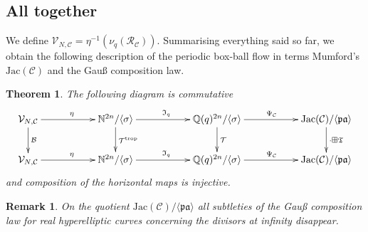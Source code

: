 \documentclass[11pt, a4paper]{amsart}
\newcommand{\jac}{\mathrm{Jac(\mathcal C)}}
\newcommand{\eqst}[1]{\begin{equation*}#1\end{equation*}}
\theoremstyle{plain}
\newtheorem{theorem}{Theorem}[section]
\newtheorem{remark}{Remark}[section]
\numberwithin{equation}{section}
\begin{document}
\subsection{All together}
We define $\mathcal V_{N,\mathcal C} = \eta^{-1}(\nu_q(\mathcal R _\mathcal C))$.
Summarising everything said so far, we obtain the following description of the periodic box-ball flow in terms Mumford's $\jac$ and the Gauß composition law. 
\begin{theorem}
\label{maintheorem2}
The following diagram is commutative
\eqst{\xymatrix{\mathcal V_{N,\mathcal C}\ar[rr]^{ \eta} \ar[d]^{\mathcal B}&& \mathbb N^{2n}{/{\langle \sigma \rangle}} \ar[rr]^{\mathfrak I _q} \ar[d]^{\mathcal T^{\mathrm{trop}}} && \mathbb Q(q)^{2n}{/{\langle \sigma \rangle}} \ar[rr]^{\Psi_\mathcal C} \ar[d]^{\mathcal T} && \mathrm{Jac}(\mathcal C)/\langle\mathfrak{pa}\rangle \ar[d]^{\cdot \boxplus \mathfrak T} \\  \mathcal V_{N,\mathcal C}\ar[rr]^{ \eta}&& \mathbb N^{2n}{/{\langle \sigma \rangle}} \ar[rr]^{\mathfrak I _q} && \mathbb Q(q)^{2n}{/{\langle \sigma \rangle}} \ar[rr]^{\Psi_\mathcal C}&&\mathrm{Jac}(\mathcal C)/\langle\mathfrak{pa}\rangle }}
and composition of the horizontal maps is injective.
\end{theorem}

\begin{remark}
On the quotient $\jac / \langle \mathfrak{pa} \rangle$ all subtleties of the Gauß composition law for real hyperelliptic curves concerning the divisors at infinity disappear.
\end{remark}
\end{document}
